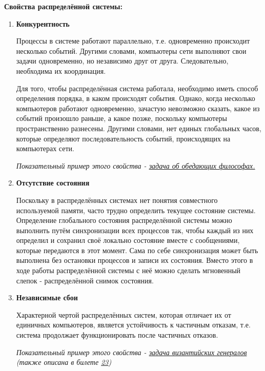 \textbf{ Свойства распределённой системы:}
\begin{enumerate}
\item \textbf{Конкурентность}

Процессы в системе работают параллельно, т.е. одновременно происходит несколько событий. Другими словами, компьютеры сети выполняют свои задачи одновременно, но независимо друг от друга. Следовательно, необходима их координация.

Для того, чтобы распределённая система работала, необходимо иметь способ определения порядка, в каком происходят события. Однако, когда несколько компьютеров работают одновременно, зачастую невозможно сказать, какое из событий произошло раньше, а какое позже, поскольку компьютеры пространственно разнесены. Другими словами, нет единых глобальных часов, которые определяют последовательность событий, происходящих на компьютерах сети.

\textit{Показательный пример этого свойства - \textcolor{blue}{\href{https://clck.ru/puqyK}{задача об обедающих философах.}}}

\item \textbf{ Отсутствие состояния}

Поскольку в распределённых системах нет понятия совместного используемой памяти, часто трудно определить текущее состояние системы. Определение глобального состояния распределённой системы можно выполнить путём синхронизации всех процессов так, чтобы каждый из них определил и сохранил своё локально состояние вместе с сообщениями, которые передаются в этот момент. Сама по себе синхронизация может быть выполнена без остановки процессов и записи их состояния. Вместо этого в ходе работы распределённой системы с неё можно сделать мгновенный слепок - распределённой снимок состояния.

\item \textbf{ Независимые сбои}

Характерной чертой распределённых систем, которая отличает их от единичных компьютеров, является устойчивость к частичным отказам, т.е. система продолжает функционировать после частичных отказов.

\textit{Показательный пример этого свойства - \textcolor{blue}{\href{https://clck.ru/JVS7z}{задача византийских генералов}} (также описана в билете \hyperlink{Byzantine_fault}{23})}\\
\end{enumerate}

